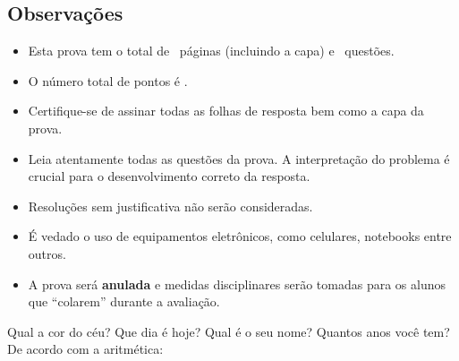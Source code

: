 \documentclass[12pt,addpoints,a4paper]{prova-ifb}
\begin{document}
\subsection*{Observações}
\begin{itemize}
	\item Esta prova tem o total de \numpages\ páginas (incluindo a capa) e \numquestions\ questões.
	\item O número total de pontos é \numpoints.
	\item Certifique-se de assinar todas as folhas de resposta bem como a capa da prova.
	\item Leia atentamente todas as questões da prova. A interpretação do problema é crucial para o desenvolvimento correto da resposta.
	\item Resoluções sem justificativa não serão consideradas.
	\item É vedado o uso de equipamentos eletrônicos, como celulares, notebooks entre outros.
	\item A prova será \textbf{anulada} e medidas disciplinares serão tomadas para os alunos que ``colarem'' durante a avaliação. 
	
\end{itemize}


\newpage

\begin{questions}
	
	\question[2] Qual a cor do céu?
	\question[2] Que dia é hoje?
	\question[2] Qual é o seu nome?
	\question[2] Quantos anos você tem?
	\question[2] De acordo com a aritmética:
	\begin{parts}
		\noaddpoints
		\part[1] 2+2?
		\part[1] 1+1?
		\addpoints
	\end{parts}
\end{questions}
	
	
\end{document}
